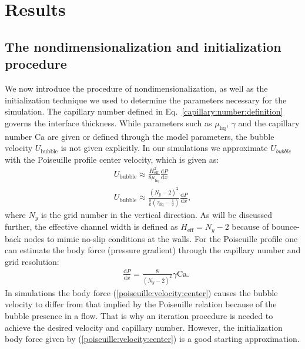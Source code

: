 \documentclass[preprint,12pt]{elsarticle}
\newcommand{\Ca}{\mathrm{Ca}}
\begin{document}
\section{Results}
\subsection{The nondimensionalization and initialization procedure}
\label{section:init}
We now introduce the procedure of nondimensionalization, as well as
the initialization technique we used to determine the parameters necessary for
the simulation. The capillary number defined in Eq.~\ref{capillary:number:definition} governs the
interface thickness.
While parameters such as $\mu_{\mathrm{liq}}$, $\gamma$ and the capillary number $\Ca$ are given
or defined through the model parameters, the bubble velocity $U_{\mathrm{bubble}}$ is not given
explicitly.
In our simulations we approximate $U_{bubble}$ with the
Poiseuille profile center velocity, which is given as:
\begin{equation}
\begin{aligned}
U_{\mathrm{bubble}} \approx \frac{H_{\mathrm{eff}}^2}{8
\mu_{\mathrm{liq}}}\frac{\mathrm{d}P}{\mathrm{d}x}\\
U_{\mathrm{bubble}}\approx
\frac{{(N_y-2)}^2}{\frac{8}{6}(\tau_{\mathrm{liq}}-\frac{1}{2})}\frac{\mathrm{d}P}{\mathrm{d}
x } ,
\end{aligned}
\end{equation}
where $N_y$ is the grid number in the vertical direction. As will be discussed further, the
effective channel width is defined as $H_{\mathrm{eff}}=N_y-2$ because of bounce-back nodes to
mimic no-slip conditions at the walls.
For the Poiseuille profile one can estimate the body force (pressure gradient) through the
capillary number and grid resolution:
\begin{equation}
\label{poiseuille:velocity:center}
\begin{aligned}
&\frac{\mathrm{d}P}{\mathrm{d}x}=\frac{8}{{(N_y-2)}^2}\gamma \Ca.
\end{aligned}
\end{equation}
In simulations the body force (\ref{poiseuille:velocity:center}) causes the bubble
velocity to differ from that implied by the Poiseuille relation because of the bubble presence in a
flow. That is
why an iteration procedure is needed to achieve the 
desired velocity and 
capillary number. 
However, the initialization body force given by (\ref{poiseuille:velocity:center}) is a good
starting approximation. 
\end{document}
